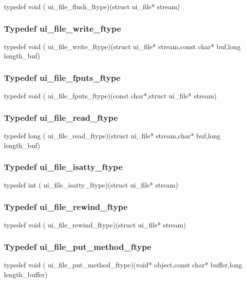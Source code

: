 {\stt typedef void ( ui\_file\_flush\_ftype)(struct ui\_file* stream)}


\subsubsection{Typedef ui\_file\_write\_ftype}
\label{type_ui_file_write_ftype_ui-file.h}

{\stt typedef void ( ui\_file\_write\_ftype)(struct ui\_file* stream,const char* buf,long length\_buf)}


\subsubsection{Typedef ui\_file\_fputs\_ftype}
\label{type_ui_file_fputs_ftype_ui-file.h}

{\stt typedef void ( ui\_file\_fputs\_ftype)(const char*,struct ui\_file* stream)}


\subsubsection{Typedef ui\_file\_read\_ftype}
\label{type_ui_file_read_ftype_ui-file.h}

{\stt typedef long ( ui\_file\_read\_ftype)(struct ui\_file* stream,char* buf,long length\_buf)}


\subsubsection{Typedef ui\_file\_isatty\_ftype}
\label{type_ui_file_isatty_ftype_ui-file.h}

{\stt typedef int ( ui\_file\_isatty\_ftype)(struct ui\_file* stream)}


\subsubsection{Typedef ui\_file\_rewind\_ftype}
\label{type_ui_file_rewind_ftype_ui-file.h}

{\stt typedef void ( ui\_file\_rewind\_ftype)(struct ui\_file* stream)}


\subsubsection{Typedef ui\_file\_put\_method\_ftype}
\label{type_ui_file_put_method_ftype_ui-file.h}

{\stt typedef void ( ui\_file\_put\_method\_ftype)(void* object,const char* buffer,long length\_buffer)}


